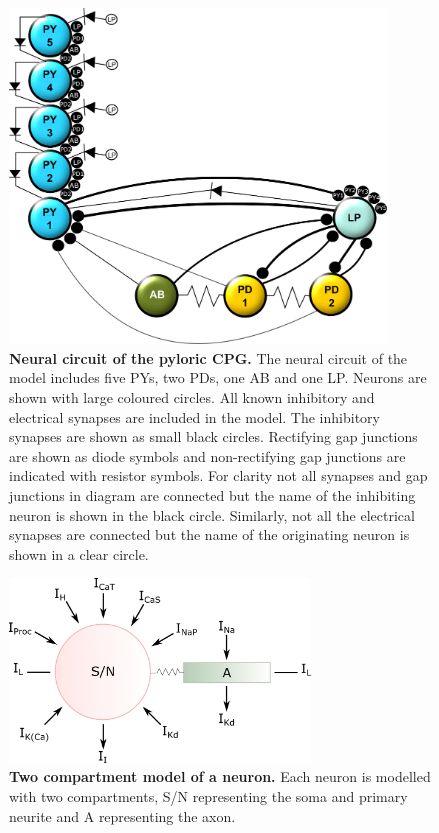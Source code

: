 \begin{figure}[H]
	\begin{center}
		\includegraphics[width=10cm]{graphics/HH_model.png}
		\caption[Neural circuit of the pyloric \ac{CPG}.]{\textbf{Neural circuit of the pyloric \ac{CPG}. }The neural circuit of the model includes five \acp{PY}, two \acp{PD}, one \ac{AB} and one \ac{LP}. Neurons are shown with large coloured circles. All known inhibitory and electrical synapses are included in the model. The inhibitory synapses are shown as small black circles. Rectifying gap junctions are shown as diode symbols and non-rectifying gap junctions are indicated with resistor symbols. For clarity not all synapses and gap junctions in diagram are connected but the name of the inhibiting neuron is shown in the black circle. Similarly, not all the electrical synapses are connected but the name of the originating neuron is shown in a clear circle.}
		\label{fig:HH_model}
	\end{center}
\end{figure}

\begin{figure}[H]
	\begin{center}
		\includegraphics[width=8cm]{graphics/two_compartment.png}
		\caption[Two compartment model of a neuron.]{\textbf{Two compartment model of a neuron.} Each neuron is modelled with two compartments, S/N representing the soma and primary neurite and A representing the axon. }
		\label{fig:two_compartment}
	\end{center}
\end{figure}



